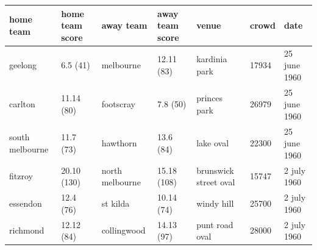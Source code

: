 \documentclass{article}
\begin{document}
\begin{tabular}{lllllll}
\toprule
home team & home team score & away team & away team score & venue & crowd & date \\
\midrule
geelong & 6.5 (41) & melbourne & 12.11 (83) & kardinia park & 17934 & 25 june 1960 \\
carlton & 11.14 (80) & footscray & 7.8 (50) & princes park & 26979 & 25 june 1960 \\
south melbourne & 11.7 (73) & hawthorn & 13.6 (84) & lake oval & 22300 & 25 june 1960 \\
fitzroy & 20.10 (130) & north melbourne & 15.18 (108) & brunswick street oval & 15747 & 2 july 1960 \\
essendon & 12.4 (76) & st kilda & 10.14 (74) & windy hill & 25700 & 2 july 1960 \\
richmond & 12.12 (84) & collingwood & 14.13 (97) & punt road oval & 28000 & 2 july 1960 \\
\bottomrule
\end{tabular}
\end{document}
